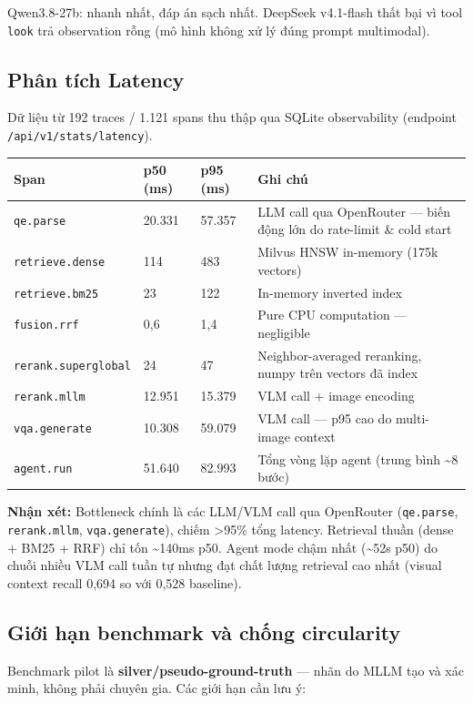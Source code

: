 \documentclass[12pt,a4paper,onecolumn]{article}
\begin{document}
Qwen3.8-27b: nhanh nhất, đáp án sạch nhất. DeepSeek v4.1-flash thất bại vì tool \texttt{look} trả observation rỗng (mô hình không xử lý đúng prompt multimodal).

\subsection{Phân tích Latency}

Dữ liệu từ 192 traces / 1.121 spans thu thập qua SQLite observability (endpoint \texttt{/api/v1/stats/latency}).

\noindent
\begin{tabularx}{\textwidth}{l l l Y}
\toprule
Span & p50 (ms) & p95 (ms) & Ghi chú \\
\midrule
\texttt{qe.parse} & 20.331 & 57.357 & LLM call qua OpenRouter — biến động lớn do rate-limit \& cold start \\
\texttt{retrieve.dense} & 114 & 483 & Milvus HNSW in-memory (175k vectors) \\
\texttt{retrieve.bm25} & 23 & 122 & In-memory inverted index \\
\texttt{fusion.rrf} & 0,6 & 1,4 & Pure CPU computation — negligible \\
\texttt{rerank.superglobal} & 24 & 47 & Neighbor-averaged reranking, numpy trên vectors đã index \\
\texttt{rerank.mllm} & 12.951 & 15.379 & VLM call + image encoding \\
\texttt{vqa.generate} & 10.308 & 59.079 & VLM call — p95 cao do multi-image context \\
\texttt{agent.run} & 51.640 & 82.993 & Tổng vòng lặp agent (trung bình \textasciitilde{}8 bước) \\
\bottomrule
\end{tabularx}


\textbf{Nhận xét:} Bottleneck chính là các LLM/VLM call qua OpenRouter (\texttt{qe.parse}, \texttt{rerank.mllm}, \texttt{vqa.generate}), chiếm >95\% tổng latency. Retrieval thuần (dense + BM25 + RRF) chỉ tốn \textasciitilde{}140ms p50. Agent mode chậm nhất (\textasciitilde{}52s p50) do chuỗi nhiều VLM call tuần tự nhưng đạt chất lượng retrieval cao nhất (visual context recall 0,694 so với 0,528 baseline).

\subsection{Giới hạn benchmark và chống circularity}

Benchmark pilot là \textbf{silver/pseudo-ground-truth} — nhãn do MLLM tạo và xác minh, không phải chuyên gia. Các giới hạn cần lưu ý:
\end{document}

